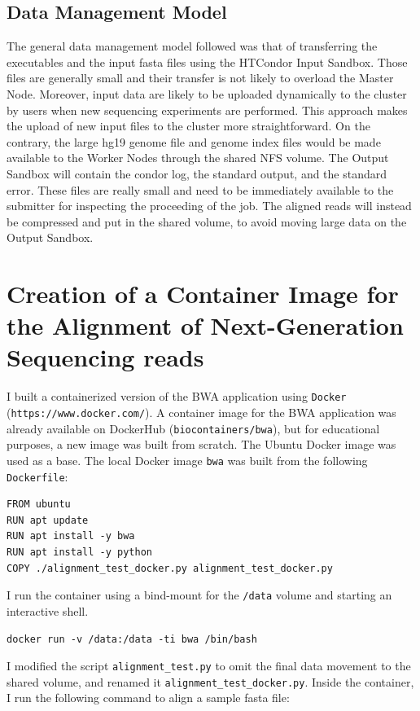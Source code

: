 \documentclass{article}
\begin{document}
\subsection{Data Management Model}
The general data management model followed was that of transferring the executables and the input fasta files using the HTCondor Input Sandbox.
Those files are generally small and their transfer is not likely to overload the Master Node.
Moreover, input data are likely to be uploaded dynamically to the cluster by users when new sequencing experiments are performed.
This approach makes the upload of new input files to the cluster more straightforward.
On the contrary, the large hg19 genome file and genome index files would be made available to the Worker Nodes through the shared NFS volume.
The Output Sandbox will contain the condor log, the standard output, and the standard error.
These files are really small and need to be immediately available to the submitter for inspecting the proceeding of the job.
The aligned reads will instead be compressed and put in the shared volume, to avoid moving large data on the Output Sandbox.

\section{Creation of a Container Image for the Alignment of Next-Generation Sequencing reads}
I built a containerized version of the BWA application using \texttt{Docker} (\texttt{https://www.docker.com/}).
A container image for the BWA application was already available on DockerHub (\texttt{biocontainers/bwa}), but for educational purposes, a new image was built from scratch.
The Ubuntu Docker image was used as a base.
The local Docker image \texttt{bwa} was built from the following \texttt{Dockerfile}:

\begin{lstlisting}
FROM ubuntu
RUN apt update
RUN apt install -y bwa
RUN apt install -y python
COPY ./alignment_test_docker.py alignment_test_docker.py
\end{lstlisting}

I run the container using a bind-mount for the \texttt{/data} volume and starting an interactive shell.

\begin{lstlisting}
docker run -v /data:/data -ti bwa /bin/bash
\end{lstlisting}

I modified the script \texttt{alignment\_test.py} to omit the final data movement to the shared volume, and renamed it \texttt{alignment\_test\_docker.py}.
Inside the container, I run the following command to align a sample fasta file:
\end{document}
